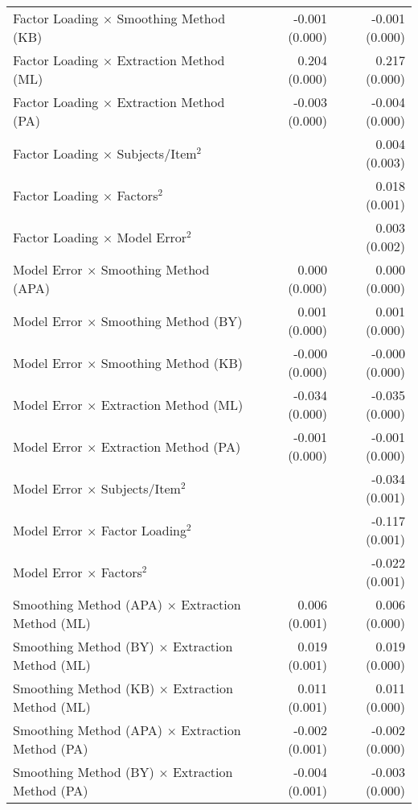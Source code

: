 \documentclass[
  english,
  man]{apa6}
\begin{document}
\begin{center}
\begin{longtable}{l D{)}{)}{11)0} D{)}{)}{11)0}}
Factor Loading $\times$ Smoothing Method (KB)          & -0.001 \; (0.000) & -0.001 \; (0.000) \\
Factor Loading $\times$ Extraction Method (ML)         & 0.204 \; (0.000)  & 0.217 \; (0.000)  \\
Factor Loading $\times$ Extraction Method (PA)         & -0.003 \; (0.000) & -0.004 \; (0.000) \\
Factor Loading $\times$ Subjects/Item$^2$              &                   & 0.004 \; (0.003)  \\
Factor Loading $\times$ Factors$^2$                    &                   & 0.018 \; (0.001)  \\
Factor Loading $\times$ Model Error$^2$                &                   & 0.003 \; (0.002)  \\
Model Error $\times$ Smoothing Method (APA)            & 0.000 \; (0.000)  & 0.000 \; (0.000)  \\
Model Error $\times$ Smoothing Method (BY)             & 0.001 \; (0.000)  & 0.001 \; (0.000)  \\
Model Error $\times$ Smoothing Method (KB)             & -0.000 \; (0.000) & -0.000 \; (0.000) \\
Model Error $\times$ Extraction Method (ML)            & -0.034 \; (0.000) & -0.035 \; (0.000) \\
Model Error $\times$ Extraction Method (PA)            & -0.001 \; (0.000) & -0.001 \; (0.000) \\
Model Error $\times$ Subjects/Item$^2$                 &                   & -0.034 \; (0.001) \\
Model Error $\times$ Factor Loading$^2$                &                   & -0.117 \; (0.001) \\
Model Error $\times$ Factors$^2$                       &                   & -0.022 \; (0.001) \\
Smoothing Method (APA) $\times$ Extraction Method (ML) & 0.006 \; (0.001)  & 0.006 \; (0.000)  \\
Smoothing Method (BY) $\times$ Extraction Method (ML)  & 0.019 \; (0.001)  & 0.019 \; (0.000)  \\
Smoothing Method (KB) $\times$ Extraction Method (ML)  & 0.011 \; (0.001)  & 0.011 \; (0.000)  \\
Smoothing Method (APA) $\times$ Extraction Method (PA) & -0.002 \; (0.001) & -0.002 \; (0.000) \\
Smoothing Method (BY) $\times$ Extraction Method (PA)  & -0.004 \; (0.001) & -0.003 \; (0.000) \\

\end{longtable}
\end{center}
\end{document}
